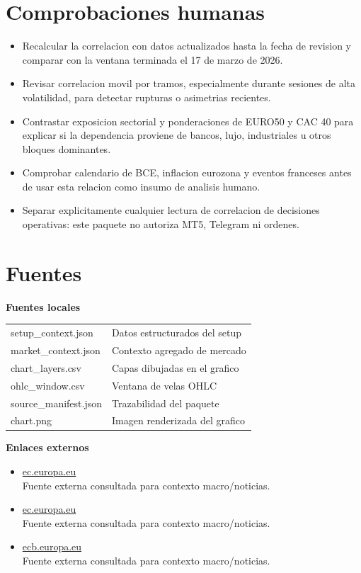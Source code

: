 \documentclass[11pt,a4paper]{article}
\begin{document}
\section*{Comprobaciones humanas}
\begin{itemize}
  \item Recalcular la correlacion con datos actualizados hasta la fecha de revision y comparar con la ventana terminada el 17 de marzo de 2026.
  \item Revisar correlacion movil por tramos, especialmente durante sesiones de alta volatilidad, para detectar rupturas o asimetrias recientes.
  \item Contrastar exposicion sectorial y ponderaciones de EURO50 y CAC 40 para explicar si la dependencia proviene de bancos, lujo, industriales u otros bloques dominantes.
  \item Comprobar calendario de BCE, inflacion eurozona y eventos franceses antes de usar esta relacion como insumo de analisis humano.
  \item Separar explicitamente cualquier lectura de correlacion de decisiones operativas: este paquete no autoriza MT5, Telegram ni ordenes.
\end{itemize}

\section*{Fuentes}
\textbf{Fuentes locales}\par
\begin{tabularx}{\textwidth}{p{4.2cm}X}
setup\_context.json & Datos estructurados del setup \\
market\_context.json & Contexto agregado de mercado \\
chart\_layers.csv & Capas dibujadas en el grafico \\
ohlc\_window.csv & Ventana de velas OHLC \\
source\_manifest.json & Trazabilidad del paquete \\
chart.png & Imagen renderizada del grafico \\
\end{tabularx}

\vspace{0.45em}
\textbf{Enlaces externos}\par
\begin{itemize}
\item \href{\detokenize{https://ec.europa.eu/eurostat/web/products-euro-indicators/w/2-02062026-ap}}{ec.europa.eu}\\[-0.15em] {\footnotesize Fuente externa consultada para contexto macro/noticias.}
\item \href{\detokenize{https://ec.europa.eu/eurostat/web/products-euro-indicators/w/2-13052026-ap}}{ec.europa.eu}\\[-0.15em] {\footnotesize Fuente externa consultada para contexto macro/noticias.}
\item \href{\detokenize{https://www.ecb.europa.eu/press/pr/date/2026/html/ecb.mp260430~81b7179e6f.en.html}}{ecb.europa.eu}\\[-0.15em] {\footnotesize Fuente externa consultada para contexto macro/noticias.}
\end{itemize}
\end{document}
